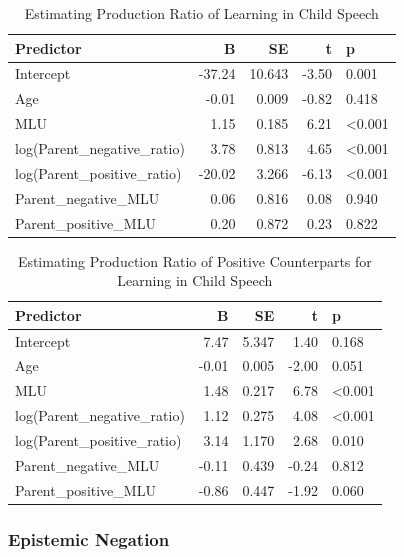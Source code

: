 \documentclass[
  english,
  man,floatsintext]{apa6}
\begin{document}
\begin{table}

\caption{\label{tab:unnamed-chunk-6}Estimating Production Ratio of Learning in Child Speech}
\centering
\begin{tabular}[t]{l|r|r|r|l}
\hline
Predictor & B & SE & t & p\\
\hline
Intercept & -37.24 & 10.643 & -3.50 & 0.001\\
\hline
Age & -0.01 & 0.009 & -0.82 & 0.418\\
\hline
MLU & 1.15 & 0.185 & 6.21 & <0.001\\
\hline
log(Parent\_negative\_ratio) & 3.78 & 0.813 & 4.65 & <0.001\\
\hline
log(Parent\_positive\_ratio) & -20.02 & 3.266 & -6.13 & <0.001\\
\hline
Parent\_negative\_MLU & 0.06 & 0.816 & 0.08 & 0.940\\
\hline
Parent\_positive\_MLU & 0.20 & 0.872 & 0.23 & 0.822\\
\hline
\end{tabular}
\end{table}

\begin{table}

\caption{\label{tab:unnamed-chunk-6}Estimating Production Ratio of Positive Counterparts for Learning in Child Speech}
\centering
\begin{tabular}[t]{l|r|r|r|l}
\hline
Predictor & B & SE & t & p\\
\hline
Intercept & 7.47 & 5.347 & 1.40 & 0.168\\
\hline
Age & -0.01 & 0.005 & -2.00 & 0.051\\
\hline
MLU & 1.48 & 0.217 & 6.78 & <0.001\\
\hline
log(Parent\_negative\_ratio) & 1.12 & 0.275 & 4.08 & <0.001\\
\hline
log(Parent\_positive\_ratio) & 3.14 & 1.170 & 2.68 & 0.010\\
\hline
Parent\_negative\_MLU & -0.11 & 0.439 & -0.24 & 0.812\\
\hline
Parent\_positive\_MLU & -0.86 & 0.447 & -1.92 & 0.060\\
\hline
\end{tabular}
\end{table}

\clearpage

\hypertarget{epistemic-negation}{%
\subsubsection{Epistemic Negation}\label{epistemic-negation}}
\end{document}
